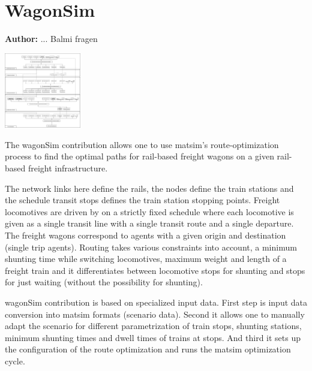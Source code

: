 \chapter{WagonSim}
\label{ch:wagonSim}

\hfill \textbf{Author:} ... Balmi fragen

\begin{center} \includegraphics[width=0.25\textwidth, angle=0]{extending/figures/wagonsim/wagonSimProcessChain.png} \end{center}


The wagonSim \gls{contribution} allows one to use \gls{matsim}'s route-optimization process to find the optimal paths for rail-based freight wagons on a given rail-based freight infrastructure.

The network links here define the rails, the nodes define the train stations and the schedule transit stops defines the train station stopping points. Freight locomotives are driven by on a strictly fixed schedule where each locomotive is given as a single transit line with a single transit route and a single departure. The freight wagons correspond to agents with a given origin and destination (single trip agents). Routing takes various constraints into account, \ie a minimum shunting time while switching locomotives, maximum weight and length of a freight train and it differentiates between locomotive stops for shunting and stops for just waiting (without the possibility for shunting).

wagonSim \gls{contribution} is based on specialized input data. First step is input data conversion into \gls{matsim} formats (scenario data). Second it allows one to manually adapt the scenario for different parametrization of train stops, shunting stations, minimum shunting times and dwell times of trains at stops. And third it sets up the configuration of the route optimization and runs the \gls{matsim} optimization cycle.

